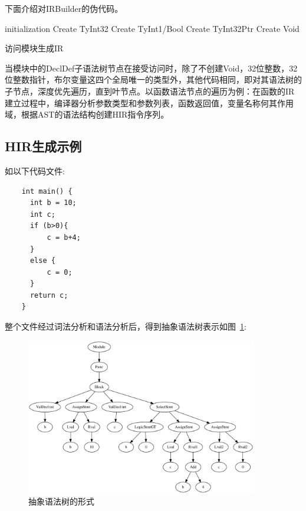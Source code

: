 下面介绍对IRBuilder的伪代码。

\begin{algorithm}[htb]
  \small
  \SetAlgoLined
  initialization\;
  Create TyInt32\;
  Create TyInt1/Bool\;
  Create TyInt32Ptr\;
  Create Void\;
  \caption{访问模块生成IR}
  \label{algo:algorithm1}
\end{algorithm}

当模块中的DeclDef子语法树节点在接受访问时，除了不创建Void，32位整数，32位整数指针，布尔变量这四个全局唯一的类型外，其他代码相同，即对其语法树的子节点，深度优先遍历，直到叶节点。以函数语法节点的遍历为例：在函数的IR建立过程中，编译器分析参数类型和参数列表，函数返回值，变量名称何其作用域，根据AST的语法结构创建HIR指令序列。

\subsection{HIR生成示例}

如以下代码文件:

\begin{verbatim}
    int main() {
      int b = 10;
      int c;
      if (b>0){
    	  c = b+4;  
      }
      else {
    	  c = 0;
      }
      return c;
    }
\end{verbatim}

整个文件经过词法分析和语法分析后，得到抽象语法树表示如图~\ref{fig:AST}:

\begin{figure}[htb]
  \centering
  \includegraphics[width=0.9\textwidth]{figures/ast.pdf}
  \caption{抽象语法树的形式}
  \label{fig:AST}
\end{figure}


